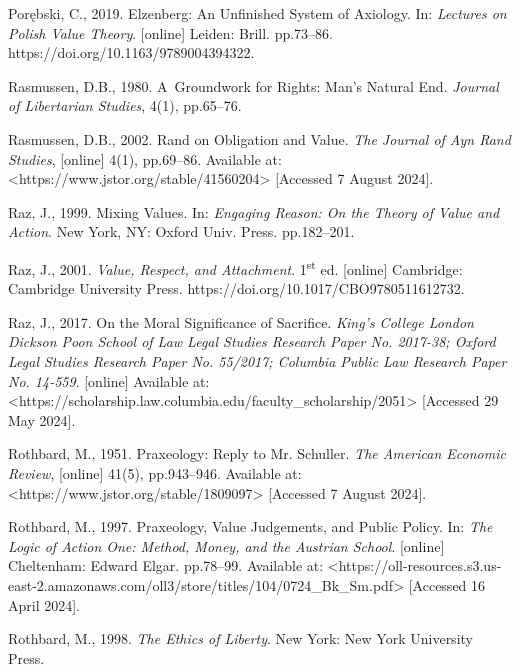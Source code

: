 Porębski, C., 2019. Elzenberg: An Unfinished System of Axiology. In: \textit{Lectures on Polish Value Theory}. [online] Leiden: Brill. pp.73–86. https://doi.org/10.1163/9789004394322.



Rasmussen, D.B., 1980. A~Groundwork for Rights: Man's Natural End. \textit{Journal of Libertarian Studies}, 4(1), pp.65–76.



Rasmussen, D.B., 2002. Rand on Obligation and Value. \textit{The Journal of Ayn Rand Studies}, [online] 4(1), pp.69–86. Available at: {\textless}https://www.jstor.org/stable/41560204{\textgreater} [Accessed 7 August 2024].



Raz, J., 1999. Mixing Values. In: \textit{Engaging Reason: On the Theory of Value and Action}. New York, NY: Oxford Univ. Press. pp.182–201.



Raz, J., 2001. \textit{Value, Respect, and Attachment}. 1\textsuperscript{st} ed. [online] Cambridge: Cambridge University Press. https://doi.org/10.1017/CBO9780511612732.



Raz, J., 2017. On the Moral Significance of Sacrifice. \textit{King's College London Dickson Poon School of Law Legal Studies Research Paper No. 2017-38; Oxford Legal Studies Research Paper No. 55/2017; Columbia Public Law Research Paper No. 14-559}. [online] Available at: {\textless}https://scholarship.law.columbia.edu/faculty\_scholarship/2051{\textgreater} [Accessed 29 May 2024].



Rothbard, M., 1951. Praxeology: Reply to Mr. Schuller. \textit{The American Economic Review}, [online] 41(5), pp.943–946. Available at: {\textless}https://www.jstor.org/stable/1809097{\textgreater} [Accessed 7 August 2024].



Rothbard, M., 1997. Praxeology, Value Judgements, and Public Policy. In: \textit{The Logic of Action One: Method, Money, and the Austrian School}. [online] Cheltenham: Edward Elgar. pp.78–99. Available at: {\textless}https://oll-resources.s3.us-east-2.amazonaws.com/oll3/store/titles/104/0724\_Bk\_Sm.pdf{\textgreater} [Accessed 16 April 2024].



Rothbard, M., 1998. \textit{The Ethics of Liberty}. New York: New York University Press.



